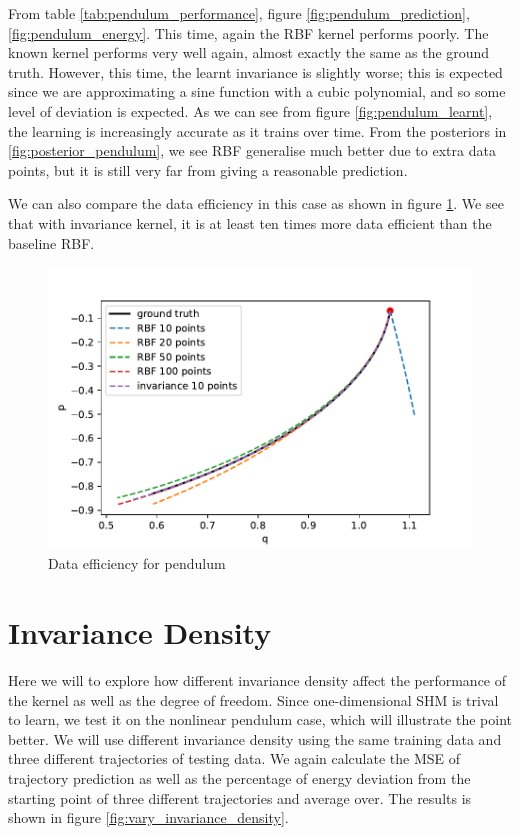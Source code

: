 \documentclass{statsmsc}
\begin{document}
From table \ref{tab:pendulum_performance}, figure \ref{fig:pendulum_prediction}, \ref{fig:pendulum_energy}.
This time, again the RBF kernel performs poorly.
The known kernel performs very well again, almost exactly the same as the ground truth.
However, this time, the learnt invariance is slightly worse; this is expected since we are approximating a sine function with a cubic polynomial, and so some level of deviation is expected.
As we can see from figure \ref{fig:pendulum_learnt}, the learning is increasingly accurate as it trains over time.
From the posteriors in \ref{fig:posterior_pendulum}, we see RBF generalise much better due to extra data points, but it is still very far from giving a reasonable prediction. 

We can also compare the data efficiency in this case as shown in figure \ref{fig:data_efficiency}. 
We see that with invariance kernel, it is at least ten times more data efficient than the baseline RBF.

\begin{figure}[H] 
  \includegraphics[width=0.8\linewidth]{../codes/figures/data_efficiency.pdf}
  \centering
  \caption{Data efficiency for pendulum}
  \label{fig:data_efficiency}
\end{figure}

\section{Invariance Density}
Here we will to explore how different invariance density affect the performance of the kernel as well as the degree of freedom.
Since one-dimensional SHM is trival to learn, we test it on the nonlinear pendulum case, which will illustrate the point better. 
We will use different invariance density using the same training data and three different trajectories of testing data.
We again calculate the MSE of trajectory prediction as well as the percentage of energy deviation from the starting point of three different trajectories and average over.
The results is shown in figure \ref{fig:vary_invariance_density}.
\end{document}
